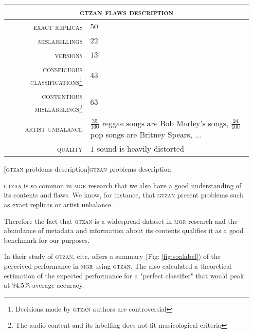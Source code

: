 \begin{center}

  \begin{tabularx}{\textwidth}{r | X}
    \multicolumn{2}{c}{\textsc{gtzan flaws description}} \\
    \hline

    \textsc{exact replicas} & $50$ \\
    \textsc{mislabellings} & $22$ \\
    \textsc{versions} & $13$ \\
    \textsc{conspicuous classifications\footnote{Decisions made by \textsc{gtzan} authors are controversial}} & $43$ \\
    \textsc{contentious misllabelings\footnote{The audio content and its labelling does not fit musicological criteria}} & $63$ \\
    \textsc{artist unbalance} & $\frac{35}{100}$ reggae songs are Bob Marley's songs, $\frac{24}{100}$ pop songs are Britney Spears, ... \\
    \textsc{quality} & $1$ sound is heavily distorted \\
    \hline

  \end{tabularx}

  [\textsc{gtzan} problems description]{\textsc{gtzan} problems description \citep{metaGTZAN}}
  \label{tab:gtzanflaws}

\end{center}



\textsc{gtzan} is so common in \textsc{\textsc{mgr}} research that we also have a good understanding of its contents and flaws. We know, for instance, that \textsc{gtzan} present problems such as exact replicas or artist unbalance.

Therefore the fact that \textsc{gtzan} is a widespread dataset in \textsc{\textsc{mgr}} research and the abundance of metadata and information about its contents qualifies it as a good benchmark for our purposes.

In their study of \textsc{gtzan}, cite, offers a summary (Fig: \ref{fig:soalabel}) of the perceived performance in \textsc{\textsc{mgr}} using \textsc{gtzan}.  The also calculated a theoretical estimation of the expected performance for a "perfect classifier" that would peak at $94.5\%$ average accuracy.


